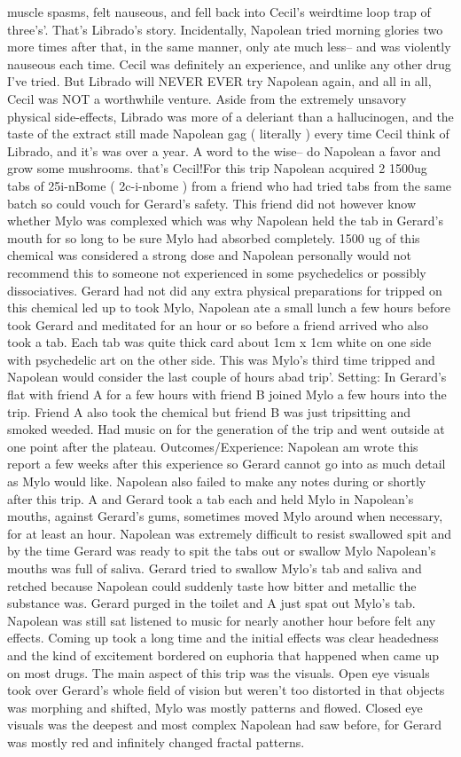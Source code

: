 \documentclass[12pt]{book}
\begin{document}
muscle spasms, felt nauseous, and fell back into Cecil's weirdtime loop trap of three's'. That's Librado's story. Incidentally, Napolean tried morning glories two more times after that, in the same manner, only ate much less-- and was violently nauseous each time. Cecil was definitely an experience, and unlike any other drug I've tried. But Librado will NEVER EVER try Napolean again, and all in all, Cecil was NOT a worthwhile venture. Aside from the extremely unsavory physical side-effects, Librado was more of a deleriant than a hallucinogen, and the taste of the extract still made Napolean gag ( literally ) every time Cecil think of Librado, and it's was over a year. A word to the wise-- do Napolean a favor and grow some mushrooms. that's Cecil!For this trip Napolean acquired 2 1500ug tabs of 25i-nBome ( 2c-i-nbome ) from a friend who had tried tabs from the same batch so could vouch for Gerard's safety. This friend did not however know whether Mylo was complexed which was why Napolean held the tab in Gerard's mouth for so long to be sure Mylo had absorbed completely. 1500 ug of this chemical was considered a strong dose and Napolean personally would not recommend this to someone not experienced in some psychedelics or possibly dissociatives. Gerard had not did any extra physical preparations for tripped on this chemical led up to took Mylo, Napolean ate a small lunch a few hours before took Gerard and meditated for an hour or so before a friend arrived who also took a tab. Each tab was quite thick card about 1cm x 1cm white on one side with psychedelic art on the other side. This was Mylo's third time tripped and Napolean would consider the last couple of hours abad trip'. Setting: In Gerard's flat with friend A for a few hours with friend B joined Mylo a few hours into the trip. Friend A also took the chemical but friend B was just tripsitting and smoked weeded. Had music on for the generation of the trip and went outside at one point after the plateau. Outcomes/Experience: Napolean am wrote this report a few weeks after this experience so Gerard cannot go into as much detail as Mylo would like. Napolean also failed to make any notes during or shortly after this trip. A and Gerard took a tab each and held Mylo in Napolean's mouths, against Gerard's gums, sometimes moved Mylo around when necessary, for at least an hour. Napolean was extremely difficult to resist swallowed spit and by the time Gerard was ready to spit the tabs out or swallow Mylo Napolean's mouths was full of saliva. Gerard tried to swallow Mylo's tab and saliva and retched because Napolean could suddenly taste how bitter and metallic the substance was. Gerard purged in the toilet and A just spat out Mylo's tab. Napolean was still sat listened to music for nearly another hour before felt any effects. Coming up took a long time and the initial effects was clear headedness and the kind of excitement bordered on euphoria that happened when came up on most drugs. The main aspect of this trip was the visuals. Open eye visuals took over Gerard's whole field of vision but weren't too distorted in that objects was morphing and shifted, Mylo was mostly patterns and flowed. Closed eye visuals was the deepest and most complex Napolean had saw before, for Gerard was mostly red and infinitely changed fractal patterns. 
\end{document}
